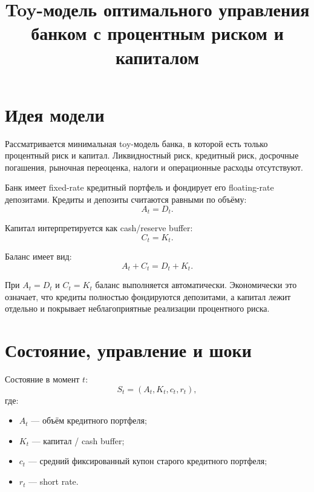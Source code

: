 \documentclass[11pt,a4paper]{article}
\title{Toy-модель оптимального управления банком с процентным риском и капиталом}
\author{}
\date{}
\newcommand{\1}{\mathbf{1}}
\begin{document}
\maketitle

\section{Идея модели}

Рассматривается минимальная toy-модель банка, в которой есть только процентный риск и капитал. Ликвидностный риск, кредитный риск, досрочные погашения, рыночная переоценка, налоги и операционные расходы отсутствуют.

Банк имеет fixed-rate кредитный портфель и фондирует его floating-rate депозитами. Кредиты и депозиты считаются равными по объёму:
\begin{equation}
    A_t = D_t.
\end{equation}

Капитал интерпретируется как cash/reserve buffer:
\begin{equation}
    C_t = K_t.
\end{equation}

Баланс имеет вид:
\begin{equation}
    A_t + C_t = D_t + K_t.
\end{equation}

При $A_t=D_t$ и $C_t=K_t$ баланс выполняется автоматически. Экономически это означает, что кредиты полностью фондируются депозитами, а капитал лежит отдельно и покрывает неблагоприятные реализации процентного риска.

\section{Состояние, управление и шоки}

Состояние в момент $t$:
\begin{equation}
    S_t = (A_t, K_t, c_t, r_t),
\end{equation}
где:
\begin{itemize}[noitemsep]
    \item $A_t$ --- объём кредитного портфеля;
    \item $K_t$ --- капитал / cash buffer;
    \item $c_t$ --- средний фиксированный купон старого кредитного портфеля;
    \item $r_t$ --- short rate.
\end{itemize}
\end{document}

